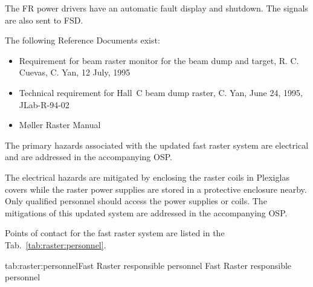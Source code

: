 \begin{safetyen}{0}{0}
\noindent The FR power drivers have an automatic fault display and
shutdown. The signals are also sent to FSD.

The following Reference Documents exist:
\begin{itemize}
\item{Requirement for beam raster monitor for the beam dump and target,
R. C. Cuevas, C. Yan, 12 July, 1995}
\item{Technical requirement for Hall~C beam dump raster,
C. Yan, June 24, 1995, JLab-R-94-02}

\item{M\o ller Raster Manual~\cite{docdb:moellerraster}}
\end{itemize}


The primary hazards associated with the updated fast raster system
are electrical and are addressed in the accompanying OSP.


The electrical hazards are mitigated by enclosing the raster coils in
Plexiglas covers while the raster power supplies are stored in a
protective enclosure nearby. Only qualified personnel should access
the power supplies or coils. The mitigations of this updated system
are addressed in the accompanying OSP.


Points of contact for the fast raster system are listed in the Tab.~\ref{tab:raster:personnel}.
\begin{namestab}{tab:raster:personnel}{Fast Raster responsible personnel}{%
          Fast Raster responsible personnel}
\end{namestab}
\end{safetyen}


